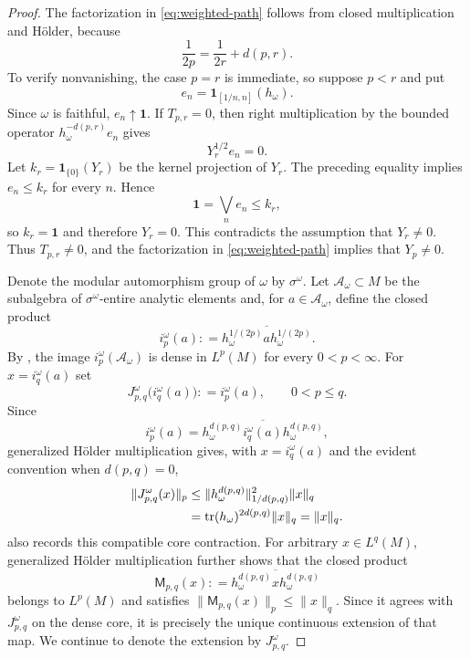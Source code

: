 \documentclass[12pt]{article}
\numberwithin{equation}{section}
\theoremstyle{definition}
\theoremstyle{remark}
\newcommand{\one}{\mathbf 1}
\newcommand{\?}{\overset{?}{=}}
\newcommand{\defeq}{\mathrel{\mathop:}=}
\DeclareMathOperator{\tr}{tr}
\begin{document}
\begin{proof}
The factorization in
\eqref{eq:weighted-path} follows from closed multiplication and H\"older,
because
\begin{equation}
  \frac1{2p}=\frac1{2r}+d(p,r).
\end{equation}
To verify nonvanishing, the case $p=r$ is immediate, so suppose
$p<r$ and put
\[
  e_n=\one_{[1/n,n]}(h_\omega).
\]
Since $\omega$ is faithful, $e_n\uparrow\one$. If $T_{p,r}=0$, then
right multiplication by the bounded operator
$h_\omega^{-d(p,r)}e_n$ gives
\[
  Y_r^{1/2}e_n=0 .
\]
Let $k_r=\one_{\{0\}}(Y_r)$ be the kernel projection of $Y_r$.
The preceding equality implies $e_n\leq k_r$ for every $n$. Hence
\[
  \one=\bigvee_n e_n\leq k_r,
\]
so $k_r=\one$ and therefore $Y_r=0$. This contradicts the assumption
that $Y_r\neq0$. Thus $T_{p,r}\neq0$, and the factorization in
\eqref{eq:weighted-path} implies that $Y_p\neq0$.

Denote the modular automorphism group of $\omega$ by $\sigma^\omega$.
Let $\mathcal A_\omega\subset M$ be the subalgebra of 
$\sigma^\omega$-entire analytic elements and, for $a\in\mathcal A_\omega$, define the
closed product
\begin{equation}
  i_p^\omega(a)
  \defeq \overline{h_\omega^{1/(2p)}a h_\omega^{1/(2p)}}.
  \label{eq:compatible-core-embedding}
\end{equation}
By \cite[Lemma~1.1]{Junge:2003nbr}, the image
$i_p^\omega(\mathcal A_\omega)$ is dense in $L^p(M)$ for every $0<p<\infty$.
For $x=i_q^\omega(a)$ set
\begin{equation}
  J_{p,q}^\omega\bigl(i_q^\omega(a)\bigr)
  \defeq i_p^\omega(a),
  \qquad 0<p\leq q.
  \label{eq:downward-map}
\end{equation}
Since
\begin{equation}
  i_p^\omega(a)
  =\overline{h_\omega^{d(p,q)}
             i_q^\omega(a)
             h_\omega^{d(p,q)}},
\end{equation}
generalized H\"older multiplication gives, with $x=i_q^\omega(a)$ and the evident convention when $d(p,q)=0$,
\begin{align}
  \|J_{p,q}^\omega(x)\|_p
  &\leq
  \|h_\omega^{d(p,q)}\|_{1/d(p,q)}^2\|x\|_q\notag\\
  &=\tr(h_\omega)^{2d(p,q)}\|x\|_q
  =\|x\|_q.
  \label{eq:downward-contraction}
\end{align}
\cite[Proposition~2.6]{Gu:2019jfc} also records this compatible core
contraction.  For arbitrary $x\in L^q(M)$, generalized H\"older
multiplication further shows that the closed product
\begin{equation}
  \mathsf M_{p,q}(x)
  \defeq\overline{h_\omega^{d(p,q)}x h_\omega^{d(p,q)}}
  \label{eq:downward-closed-product}
\end{equation}
belongs to $L^p(M)$ and satisfies
$\|\mathsf M_{p,q}(x)\|_p\leq\|x\|_q$.  Since it agrees with
$J_{p,q}^\omega$ on the dense core, it is precisely the unique continuous
extension of that map.  We continue to denote the extension by
$J_{p,q}^\omega$.


\end{proof}
\end{document}
